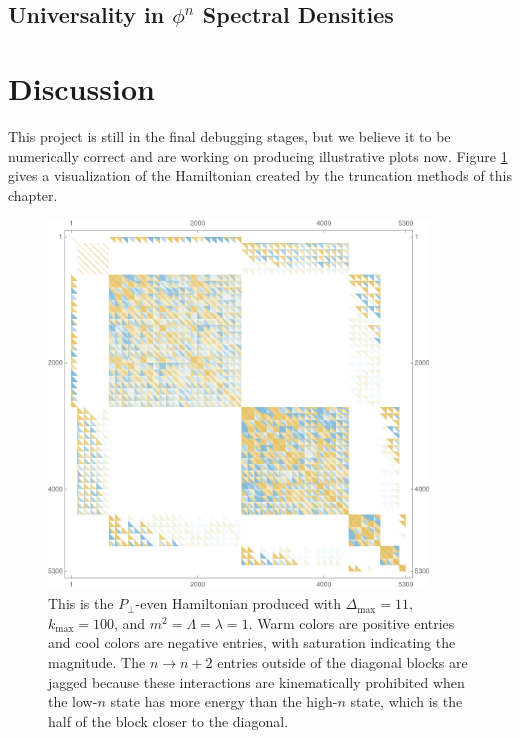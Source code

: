 

\subsection{Universality in $\phi^n$ Spectral Densities}








\section{Discussion}
\label{sec:Discussion}

This project is still in the final debugging stages, but we believe it to be
numerically correct and are working on producing illustrative plots now. Figure
\ref{fig:hamiltonian} gives a visualization of the Hamiltonian created by the 
truncation methods of this chapter.

\begin{figure}
\centering
\includegraphics[width=0.9\textwidth]{truncation_chapter/hamiltonian}	
\caption[Visualization of truncated Hamiltonian]{This is the $P_\perp$-even 
    Hamiltonian produced with $\Delta_\mathrm{max} = 11$, 
    $k_\mathrm{max} = 100$, and $m^2 = \Lambda = \lambda = 1$. Warm colors are
    positive entries and cool colors are negative entries, with saturation 
    indicating the magnitude. The $n \to n+2$ entries outside of the diagonal
    blocks are jagged because these interactions are kinematically prohibited 
    when the low-$n$ state has more energy than the high-$n$ state, which is the
    half of the block closer to the diagonal.}
\label{fig:hamiltonian}
\end{figure}

